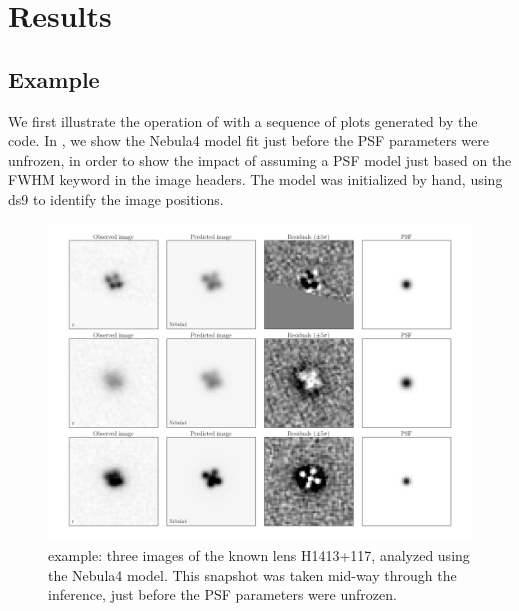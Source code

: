 \documentclass[useAMS,usenatbib]{mn2e}
\begin{document}



\section{Results}
\label{sec:results}

\subsection{Example}
\label{sec:results:example}

We first illustrate the operation of \LT with a sequence of plots generated
by the code. In , we show the Nebula4 model
fit just before the PSF parameters were unfrozen, in order to show the
impact of assuming a PSF model just based on the FWHM keyword in the image
headers. The model was initialized by hand, using ds9 to identify the image
positions.

\begin{figure}
\centerline{
\includegraphics[width=0.9\linewidth]{figs/H1413+117_10x10arcsec_progress-06_optimizing_Nebula4.png}}
\caption{\LT example: three images of the known lens H1413+117, analyzed using
the Nebula4 model. This snapshot was taken mid-way through the inference, just
before the PSF parameters were unfrozen.}
\label{fig:H1413example-progress}
\end{figure}
\end{document}
